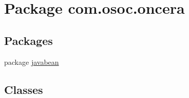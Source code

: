 \hypertarget{namespacecom_1_1osoc_1_1oncera}{}\section{Package com.\+osoc.\+oncera}
\label{namespacecom_1_1osoc_1_1oncera}
\subsection*{Packages}
\begin{DoxyCompactItemize}
\item 
package \mbox{\hyperlink{namespacecom_1_1osoc_1_1oncera_1_1javabean}{javabean}}
\end{DoxyCompactItemize}
\subsection*{Classes}
